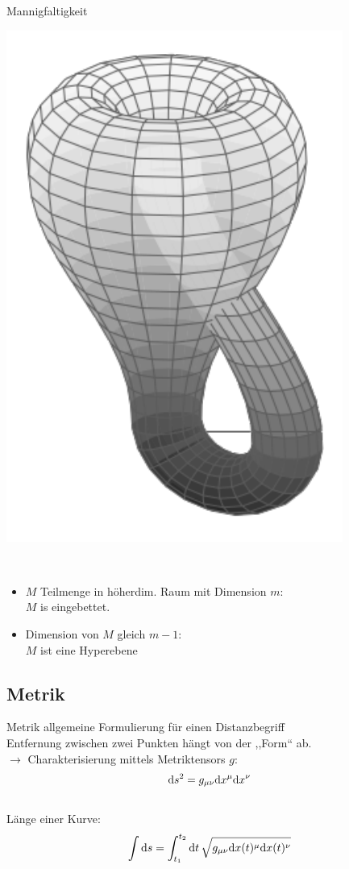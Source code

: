 \documentclass[mathserif]{beamer}
\theoremstyle{definition}
\begin{document}
\begin{frame}{Mannigfaltigkeit}
\begin{minipage}{0.45\linewidth}
			\centering
			\includegraphics[scale=0.3]{bottle.pdf}
		\end{minipage}\\
		\begin{itemize}
			\item $M$ Teilmenge in h\"oherdim. Raum mit Dimension $m$:\\
			$M$ is eingebettet.\\
			\pause
			\item Dimension von $M$ gleich $m-1$:\\
			$M$ ist eine Hyperebene
		\end{itemize}
	\end{frame}
\subsection{Metrik}
	\begin{frame}{Metrik}
		allgemeine Formulierung für einen Distanzbegriff\\
		Entfernung zwischen zwei Punkten hängt von der ,,Form`` ab.\\
		\pause
		$\rightarrow$ Charakterisierung mittels Metriktensors $g$:
		\begin{align}
			{\rm d}s^2=g_{\mu\nu}{\rm d}x^\mu{\rm d}x^\nu
		\end{align}\\
		Länge einer Kurve:
		\begin{align}
			\int {\rm d}s=\int_{t_1}^{t_2}{\rm d}t\, \sqrt{g_{\mu\nu}{\rm d}x(t)^\mu{\rm d}x(t)^\nu}
		\end{align}
	\end{frame}
	
\end{document}
